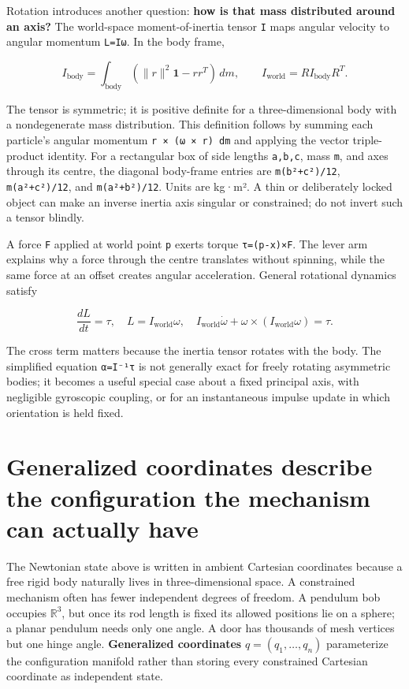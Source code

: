 Rotation introduces another question: \textbf{how is that mass distributed around an axis?} The world-space moment-of-inertia tensor \texttt{I} maps angular velocity to angular momentum \texttt{L=Iω}. In the body frame,

\[
I_{\mathrm{body}}=\int_{\mathrm{body}}(\|r\|^2\mathbf{1}-rr^T)\,dm,
\qquad I_{\mathrm{world}}=R I_{\mathrm{body}}R^T.
\]

The tensor is symmetric; it is positive definite for a three-dimensional body with a nondegenerate mass distribution. This definition follows by summing each particle's angular momentum \texttt{r\ ×\ (ω\ ×\ r)\ dm} and applying the vector triple-product identity. For a rectangular box of side lengths \texttt{a,b,c}, mass \texttt{m}, and axes through its centre, the diagonal body-frame entries are \texttt{m(b²+c²)/12}, \texttt{m(a²+c²)/12}, and \texttt{m(a²+b²)/12}. Units are kg·m². A thin or deliberately locked object can make an inverse inertia axis singular or constrained; do not invert such a tensor blindly.

A force \texttt{F} applied at world point \texttt{p} exerts torque \texttt{τ=(p-x)×F}. The lever arm explains why a force through the centre translates without spinning, while the same force at an offset creates angular acceleration. General rotational dynamics satisfy

\[
\frac{dL}{dt}=\tau,\quad L=I_{\mathrm{world}}\omega,\quad
I_{\mathrm{world}}\dot\omega+\omega\times(I_{\mathrm{world}}\omega)=\tau .
\]

The cross term matters because the inertia tensor rotates with the body. The simplified equation \texttt{α=I⁻¹τ} is not generally exact for freely rotating asymmetric bodies; it becomes a useful special case about a fixed principal axis, with negligible gyroscopic coupling, or for an instantaneous impulse update in which orientation is held fixed.

\section{Generalized coordinates describe the configuration the mechanism can actually have}\label{06-engine-ii-ch033-generalized-coordinates-describe-the-configuration-the-mechanism-can-actually-have}

The Newtonian state above is written in ambient Cartesian coordinates because a free rigid body naturally lives in three-dimensional space. A constrained mechanism often has fewer independent degrees of freedom. A pendulum bob occupies \(\mathbb R^3\), but once its rod length is fixed its allowed positions lie on a sphere; a planar pendulum needs only one angle. A door has thousands of mesh vertices but one hinge angle. \textbf{Generalized coordinates} \(q=(q_1,\ldots,q_n)\) parameterize the configuration manifold rather than storing every constrained Cartesian coordinate as independent state.

